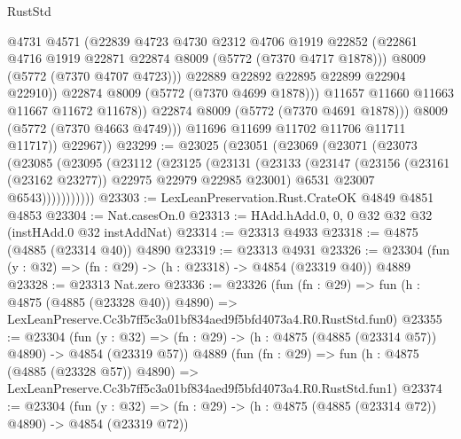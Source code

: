 \begin{lexlean}{RustStd}
\begin{coremodule}
                          @4731
                          @4571
                          (@22839
                            @4723
                            @4730
                            @2312
                            @4706
                            @1919
                            @22852
                            (@22861 @4716 @1919 @22871 @22874 @8009 (@5772 (@7370 @4717 @1878)))
                            @8009
                            (@5772 (@7370 @4707 @4723)))
                          @22889
                          @22892
                          @22895
                          @22899
                          @22904
                          @22910))
                      @22874
                      @8009
                      (@5772 (@7370 @4699 @1878)))
                    @11657
                    @11660
                    @11663
                    @11667
                    @11672
                    @11678))
                @22874
                @8009
                (@5772 (@7370 @4691 @1878)))
              @8009
              (@5772 (@7370 @4663 @4749)))
            @11696
            @11699
            @11702
            @11706
            @11711
            @11717))
        @22967))
@23299 := @23025
    (@23051
      (@23069
        (@23071
          (@23073
            (@23085
              (@23095
                (@23112
                  (@23125
                    (@23131
                      (@23133
                        (@23147
                          (@23156 (@23161 (@23162 @23277)) @22975 @22979 @22985 @23001)
                          @6531
                          @23007
                          @6543)))))))))))
@23303 := LexLeanPreservation.Rust.CrateOK @4849 @4851 @4853
@23304 := Nat.casesOn.{0}
@23313 := HAdd.hAdd.{0, 0, 0} @32 @32 @32 (instHAdd.{0} @32 instAddNat)
@23314 := @23313 @4933
@23318 := @4875 (@4885 (@23314 @40)) @4890
@23319 := @23313 @4931
@23326 := @23304 (fun (y : @32) => (fn : @29) -> (h : @23318) -> @4854 (@23319 @40)) @4889
@23328 := @23313 Nat.zero
@23336 := @23326
    (fun (fn : @29) =>
    fun (h : @4875 (@4885 (@23328 @40)) @4890) =>
    LexLeanPreserve.Cc3b7ff5c3a01bf834aed9f5bfd4073a4.R0.RustStd.fun0)
@23355 := @23304
    (fun (y : @32) => (fn : @29) -> (h : @4875 (@4885 (@23314 @57)) @4890) -> @4854 (@23319 @57))
    @4889
    (fun (fn : @29) =>
    fun (h : @4875 (@4885 (@23328 @57)) @4890) =>
    LexLeanPreserve.Cc3b7ff5c3a01bf834aed9f5bfd4073a4.R0.RustStd.fun1)
@23374 := @23304
    (fun (y : @32) => (fn : @29) -> (h : @4875 (@4885 (@23314 @72)) @4890) -> @4854 (@23319 @72))

\end{coremodule}
\end{lexlean}
